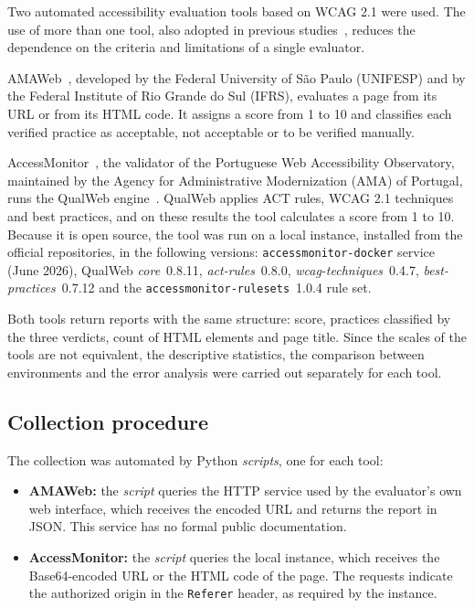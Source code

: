 \documentclass[12pt]{article}
\begin{document}
Two automated accessibility evaluation tools based on WCAG 2.1 were used. The use of more than one tool, also adopted in previous studies~\cite{barros2024}, reduces the dependence on the criteria and limitations of a single evaluator.

AMAWeb~\cite{amaweb}, developed by the Federal University of São Paulo (UNIFESP) and by the Federal Institute of Rio Grande do Sul (IFRS), evaluates a page from its URL or from its HTML code. It assigns a score from 1 to 10 and classifies each verified practice as acceptable, not acceptable or to be verified manually.

AccessMonitor~\cite{accessmonitor}, the validator of the Portuguese Web Accessibility Observatory, maintained by the Agency for Administrative Modernization (AMA) of Portugal, runs the QualWeb engine~\cite{qualweb}. QualWeb applies ACT rules, WCAG 2.1 techniques and best practices, and on these results the tool calculates a score from 1 to 10. Because it is open source, the tool was run on a local instance, installed from the official repositories, in the following versions: \texttt{accessmonitor-docker} service (June 2026), QualWeb \textit{core}~0.8.11, \textit{act-rules}~0.8.0, \textit{wcag-techniques}~0.4.7, \textit{best-practices}~0.7.12 and the \texttt{accessmonitor-rulesets}~1.0.4 rule set.

Both tools return reports with the same structure: score, practices classified by the three verdicts, count of HTML elements and page title. Since the scales of the tools are not equivalent, the descriptive statistics, the comparison between environments and the error analysis were carried out separately for each tool.

\subsection{Collection procedure}

The collection was automated by Python \textit{scripts}, one for each tool:
\begin{itemize}
  \item \textbf{AMAWeb:} the \textit{script} queries the HTTP service used by the evaluator's own web interface, which receives the encoded URL and returns the report in JSON. This service has no formal public documentation.
  \item \textbf{AccessMonitor:} the \textit{script} queries the local instance, which receives the Base64-encoded URL or the HTML code of the page. The requests indicate the authorized origin in the \texttt{Referer} header, as required by the instance.
\end{itemize}
\end{document}
